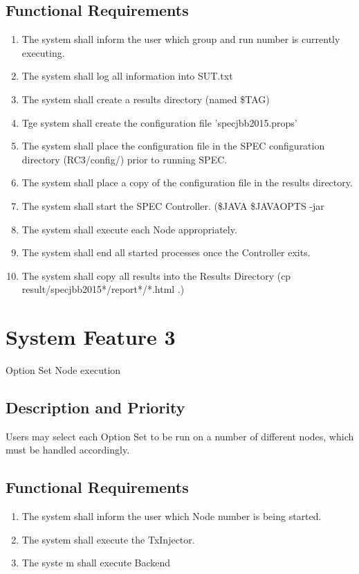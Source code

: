 \documentclass{scrreprt}
\begin{document}
\subsection{Functional Requirements}
\begin{enumerate}
	\item The system shall inform the user which group and run number is currently executing.
	\item The system shall log all information into SUT.txt
	\item The system shall create a results directory (named \$TAG)
	\item Tge system shall create the configuration file 'specjbb2015.props'
	\item The system shall place the configuration file in the SPEC configuration directory (RC3/config/) prior to running SPEC.
	\item The system shall place a copy of the configuration file in the results directory.
	\item The system shall start the SPEC Controller. (\$JAVA \$JAVAOPTS -jar
	\item The system shall execute each Node appropriately.
	\item The system shall end all started processes once the Controller exits.
	\item The system shall copy all results into the Results Directory (cp result/specjbb2015*/report*/*.html .)
\end{enumerate}
	
	
\section{System Feature 3}
Option Set Node execution

\subsection{Description and Priority}
Users may select each Option Set to be run on a number of different nodes, which must be handled accordingly.


\subsection{Functional Requirements}
	\begin{enumerate}
		\item The system shall inform the user which Node number is being started.
		\item The system shall execute the TxInjector.
		\item The syste m shall execute Backend
	\end{enumerate}
	
\end{document}
